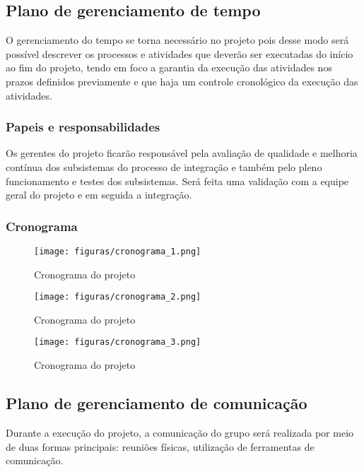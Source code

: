\subsection{Plano de gerenciamento de tempo}

O gerenciamento do tempo se torna necessário no projeto pois desse modo será possível descrever os processos e atividades que deverão ser executadas do início ao fim do projeto, tendo em foco a garantia da execução das atividades nos prazos definidos previamente e que haja um controle cronológico da execução das atividades.

\subsubsection{Papeis e responsabilidades}

Os gerentes do projeto ficarão responsável pela avaliação de qualidade e melhoria contínua dos subsistemas do processo de integração e também pelo pleno funcionamento e testes dos subsistemas. Será feita uma validação com a equipe geral do projeto e em seguida a integração.

\subsubsection{Cronograma}

\begin{figure}[H]
	\centering
	\texttt{[image: figuras/cronograma\_1.png]}
	\caption{Cronograma do projeto} \label{cronograma_1}
\end{figure}

\begin{figure}[H]
	\centering
	\texttt{[image: figuras/cronograma\_2.png]}
	\caption{Cronograma do projeto} \label{cronograma_2}
\end{figure}

\begin{figure}[H]
	\centering
	\texttt{[image: figuras/cronograma\_3.png]}
	\caption{Cronograma do projeto} \label{cronograma_2}
\end{figure}

\subsection{Plano de gerenciamento de comunicação}

Durante a execução do projeto, a comunicação do grupo será realizada por meio de duas formas principais: reuniões físicas, utilização de ferramentas de comunicação.


